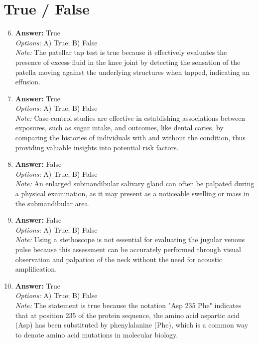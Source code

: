 \documentclass[12pt]{article}
\begin{document}
\section*{True / False}
\begin{enumerate}[label=\arabic*.]
\setcounter{enumi}{5}
\item \textbf{Answer:} True
\\ \textit{Options:} A) True; B) False
\\ \textit{Note:} The patellar tap test is true because it effectively evaluates the presence of excess fluid in the knee joint by detecting the sensation of the patella moving against the underlying structures when tapped, indicating an effusion.
\item \textbf{Answer:} True
\\ \textit{Options:} A) True; B) False
\\ \textit{Note:} Case-control studies are effective in establishing associations between exposures, such as sugar intake, and outcomes, like dental caries, by comparing the histories of individuals with and without the condition, thus providing valuable insights into potential risk factors.
\item \textbf{Answer:} False
\\ \textit{Options:} A) True; B) False
\\ \textit{Note:} An enlarged submandibular salivary gland can often be palpated during a physical examination, as it may present as a noticeable swelling or mass in the submandibular area.
\item \textbf{Answer:} False
\\ \textit{Options:} A) True; B) False
\\ \textit{Note:} Using a stethoscope is not essential for evaluating the jugular venous pulse because this assessment can be accurately performed through visual observation and palpation of the neck without the need for acoustic amplification.
\item \textbf{Answer:} True
\\ \textit{Options:} A) True; B) False
\\ \textit{Note:} The statement is true because the notation "Asp 235 Phe" indicates that at position 235 of the protein sequence, the amino acid aspartic acid (Asp) has been substituted by phenylalanine (Phe), which is a common way to denote amino acid mutations in molecular biology.
\end{enumerate}
\end{document}
